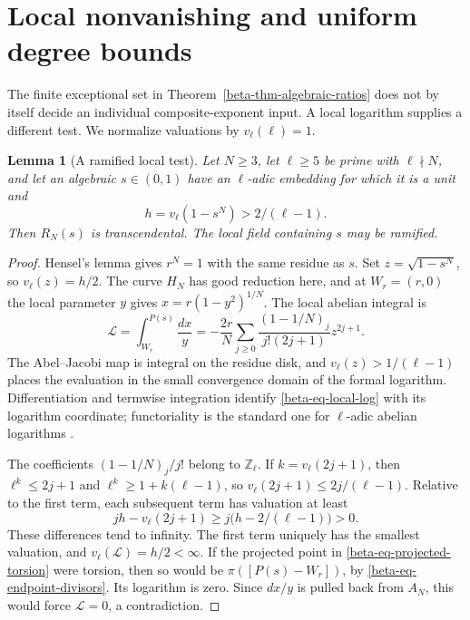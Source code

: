 \documentclass[11pt,a4paper]{article}
\newtheorem{lemma}[theorem]{Lemma}
\theoremstyle{definition}
\theoremstyle{remark}
\numberwithin{equation}{section}
\begin{document}
\section{Local nonvanishing and uniform degree bounds}
\label{beta-sec-local}

The finite exceptional set in Theorem~\ref{beta-thm-algebraic-ratios}
does not by itself decide an individual composite-exponent input.  A
local logarithm supplies a different test.  We normalize valuations by
$v_\ell(\ell)=1$.

\begin{lemma}[A ramified local test]\label{beta-lem-local}
Let $N\ge3$, let $\ell\ge5$ be prime with $\ell\nmid N$, and let an
algebraic $s\in(0,1)$ have an $\ell$-adic embedding for which it is a
unit and
\[
h=v_\ell(1-s^N)>2/(\ell-1).
\]
Then $R_N(s)$ is transcendental.  The local field containing $s$ may
be ramified.
\end{lemma}

\begin{proof}
Hensel's lemma gives $r^N=1$ with the same residue as $s$.  Set
$z=\sqrt{1-s^N}$, so $v_\ell(z)=h/2$.  The curve $H_N$ has good
reduction here, and at $W_r=(r,0)$ the local parameter $y$ gives
$x=r(1-y^2)^{1/N}$.  The local abelian integral is
\begin{equation}\label{beta-eq-local-log}
\mathcal L=\int_{W_r}^{P(s)}\frac{dx}{y}
=-\frac{2r}{N}\sum_{j\ge0}
\frac{(1-1/N)_j}{j!(2j+1)}z^{2j+1}.
\end{equation}
The Abel--Jacobi map is integral on the residue disk, and
$v_\ell(z)>1/(\ell-1)$ places the evaluation in the small convergence
domain of the formal logarithm.  Differentiation and termwise
integration identify \eqref{beta-eq-local-log} with its logarithm
coordinate; functoriality is the standard one for $\ell$-adic abelian
logarithms \cite{beta-zarhin}.

The coefficients $(1-1/N)_j/j!$ belong to $\mathbb Z_\ell$.
If $k=v_\ell(2j+1)$, then
$\ell^k\le2j+1$ and $\ell^k\ge1+k(\ell-1)$, so
$v_\ell(2j+1)\le2j/(\ell-1)$.  Relative to the first term, each
subsequent term has valuation at least
\[
jh-v_\ell(2j+1)\ge j\bigl(h-2/(\ell-1)\bigr)>0.
\]
These differences tend to infinity.  The first term uniquely has the
smallest valuation, and $v_\ell(\mathcal L)=h/2<\infty$.
If the projected point in \eqref{beta-eq-projected-torsion} were torsion,
then so would be $\pi([P(s)-W_r])$, by
\eqref{beta-eq-endpoint-divisors}.  Its logarithm is zero.  Since
$dx/y$ is pulled back from $A_N$, this would force $\mathcal L=0$,
a contradiction.
\end{proof}
\end{document}
